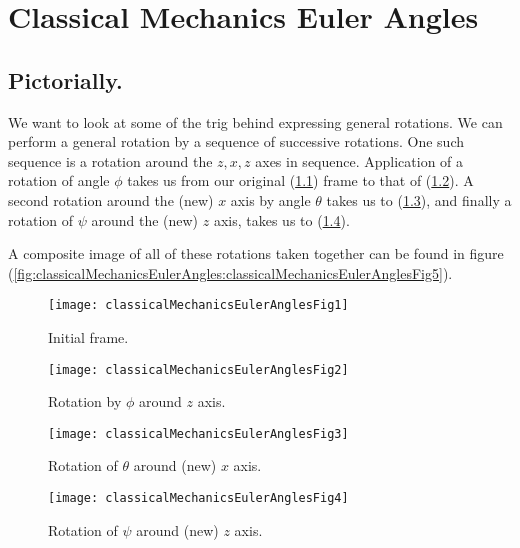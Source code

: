 
%

\chapter{Classical Mechanics Euler Angles}
\label{chap:classicalMechanicsEulerAngles}
{}
\date{Mar 21, 2012}

\beginArtWithToc

\section{Pictorially.}

We want to look at some of the trig behind expressing general rotations.  We can perform a general rotation by a sequence of successive rotations.  One such sequence is a rotation around the $z,x,z$ axes in sequence.  Application of a rotation of angle $\phi$ takes us from our original (\ref{fig:classicalMechanicsEulerAngles:classicalMechanicsEulerAnglesFig1}) frame to that of (\ref{fig:classicalMechanicsEulerAngles:classicalMechanicsEulerAnglesFig2}).  A second rotation around the (new) $x$ axis by angle $\theta$ takes us to (\ref{fig:classicalMechanicsEulerAngles:classicalMechanicsEulerAnglesFig3}), and finally a rotation of $\psi$ around the (new) $z$ axis, takes us to (\ref{fig:classicalMechanicsEulerAngles:classicalMechanicsEulerAnglesFig4}).

A composite image of all of these rotations taken together can be found in figure (\ref{fig:classicalMechanicsEulerAngles:classicalMechanicsEulerAnglesFig5}).

\begin{figure}[htp]
   \centering
   \texttt{[image: classicalMechanicsEulerAnglesFig1]}
   \caption{Initial frame.}\label{fig:classicalMechanicsEulerAngles:classicalMechanicsEulerAnglesFig1}
\end{figure}
\begin{figure}[htp]
   \centering
   \texttt{[image: classicalMechanicsEulerAnglesFig2]}
   \caption{Rotation by $\phi$ around $z$ axis.}\label{fig:classicalMechanicsEulerAngles:classicalMechanicsEulerAnglesFig2}
\end{figure}
\begin{figure}[htp]
   \centering
   \texttt{[image: classicalMechanicsEulerAnglesFig3]}
   \caption{Rotation of $\theta$ around (new) $x$ axis.}\label{fig:classicalMechanicsEulerAngles:classicalMechanicsEulerAnglesFig3}
\end{figure}
\begin{figure}[htp]
   \centering
   \texttt{[image: classicalMechanicsEulerAnglesFig4]}
   \caption{Rotation of $\psi$ around (new) $z$ axis.}\label{fig:classicalMechanicsEulerAngles:classicalMechanicsEulerAnglesFig4}
\end{figure}


